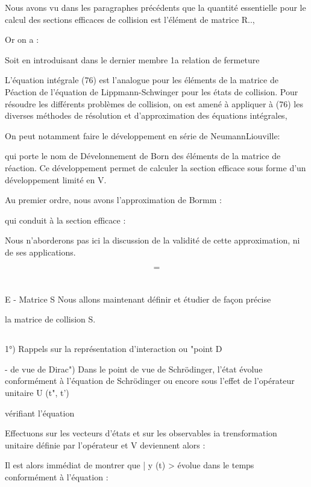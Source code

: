 Nous avons vu dans les paragraphes précédents que la quantité
essentielle pour le calcul des sections efficaces de collision est l'élément de
matrice R..,

Or on a :

Soit en introduisant dans le dernier membre 1a relation de fermeture

L'équation intégrale (76) est l'analogue pour les éléments de la matrice
de Péaction de l'équation de Lippmann-Schwinger pour les états de collision.
Pour résoudre les différents problèmes de collision, on est amené à appliquer à
(76) les diverses méthodes de résolution et d'approximation des
équations intégrales,

On peut notamment faire le développement en série de NeumannLiouville:

qui porte le nom de Dévelonnement de Born des éléments de la matrice de
réaction. Ce développement permet de calculer la section efficace sous
forme d'un développement limité en V.

Au premier ordre, nous avons l'approximation de Bormm : 

qui conduit à la section efficace :

Nous n'aborderons pas ici la discussion de la validité de cette approximation,
ni de ses applications.

\[
\tag{80}=
\]


\section{}%
E - Matrice S
Nous allons maintenant définir et étudier de façon précise

la matrice de collision S.

\subsection{}%
1°) Rappels sur la représentation d'interaction ou "point
D

- de vue de Dirac")
Dans le point de vue de Schrödinger, l'état  évolue
conformément à l'équation de Schrödinger
ou encore sous l'effet de l'opérateur unitaire U (t", t')

 vérifiant l'équation

Effectuons sur les vecteurs d'états et sur les observables ia trensformation
unitaire définie par l'opérateur  et V deviennent
alors :

Il est alors immédiat de montrer que | y (t) > évolue dans le temps conformément
à l'équation :


